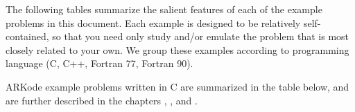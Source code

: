 \documentclass[letterpaper,10pt,english]{sphinxmanual}
\begin{document}
The following tables summarize the salient features of each of the
example problems in this document.  Each example is designed to be
relatively self-contained, so that you need only study and/or emulate
the problem that is most closely related to your own.  We group these
examples according to programming language (C, C++, Fortran 77,
Fortran 90).

ARKode example problems written in C are summarized in the table
below, and are further described in the chapters {\hyperref[\detokenize{c_serial:serial-c}]{}},
{\hyperref[\detokenize{c_openmp:openmp-c}]{}}, {\hyperref[\detokenize{c_parallel:parallel-c}]{}} and {\hyperref[\detokenize{c_parhyp:parhyp-c}]{}}.
\end{document}
